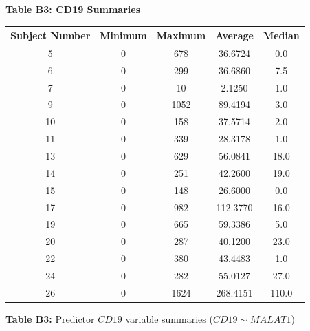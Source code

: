 \documentclass[12pt,]{article}
\begin{document}
\begin{center}

\textbf{\large{Table B3: CD19 Summaries}}

\begin{scriptsize}
\begin{tabular}{|c|c|c|c|c|}
\hline 
Subject Number & Minimum & Maximum & Average & Median \\ 
\hline
\hline
5 &  0 & 678 & 36.6724 & 0.0 \\ 
\hline  
6 &  0 & 299 & 36.6860 & 7.5 \\ 
\hline  
7 &  0 & 10 & 2.1250 & 1.0 \\ 
\hline  
9 &  0 & 1052 & 89.4194 & 3.0 \\ 
\hline  
10 & 0 & 158 & 37.5714 & 2.0 \\ 
\hline   
11 & 0 & 339 & 28.3178 & 1.0 \\ 
\hline   
13 & 0 & 629 & 56.0841 & 18.0 \\ 
\hline   
14 & 0 & 251 & 42.2600 & 19.0 \\ 
\hline   
15 & 0 & 148 & 26.6000 & 0.0 \\ 
\hline   
17 & 0 & 982 & 112.3770 & 16.0 \\ 
\hline   
19 & 0 & 665 & 59.3386 & 5.0 \\ 
\hline   
20 & 0 & 287 & 40.1200 & 23.0 \\ 
\hline   
22 & 0 & 380 & 43.4483 & 1.0 \\ 
\hline   
24 & 0 & 282 & 55.0127 & 27.0 \\ 
\hline  
26 & 0 & 1624 & 268.4151 & 110.0 \\  
\hline
\end{tabular}

\vspace{5pt}

\textbf{Table B3:} Predictor $CD19$ variable summaries ($CD19 \sim MALAT1$)
\end{scriptsize}
\end{center}
\end{document}
